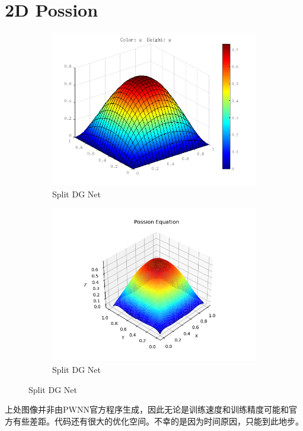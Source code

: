 \section{2D Possion}
\begin{figure}[H]
    \centering  
    \begin{subfigure}{0.45\textwidth}  
        \centering  
        \includegraphics[width=0.9\linewidth]{./pics/final/possion/dgnet2d/exact.png}  
        \caption{Split DG Net}
    \end{subfigure}  
    \begin{subfigure}{0.5\textwidth}  
        \centering  
        \includegraphics[width=0.9\linewidth]{./pics/final/possion/dgnet2d/dgnetl3gelu3000para0_1.png}  
        \caption{Split DG Net}
    \end{subfigure}  
\end{figure} 

上处图像并非由PWNN官方程序生成，因此无论是训练速度和训练精度可能和官方有些差距。代码还有很大的优化空间。不幸的是因为时间原因，只能到此地步。
